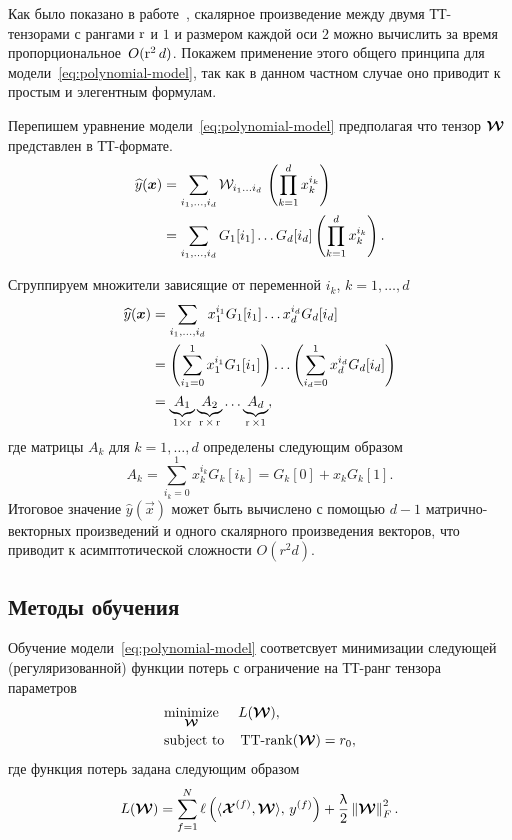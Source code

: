 Как было показано в работе~\cite{oseledets2011ttMain}, скалярное произведение между двумя ТТ-тензорами с рангами $\operatorname{r}$ и $1$ и размером каждой оси $2$ можно вычислить за время пропорциональное~$O(\operatorname{r}^2 d)$. Покажем применение этого общего принципа для модели~\eqref{eq:polynomial-model}, так как в данном частном случае оно приводит к простым и элегентным формулам.

Перепишем уравнение модели~\eqref{eq:polynomial-model} предполагая что тензор $\boldsymbol{\mathcal{W}}$ представлен в ТТ-формате.
\begin{equation*}
\begin{aligned}
\widehat{y}(\boldsymbol{x}) &= \sum_{i_1, \ldots, i_d} \mathcal{W}_{i_1 \ldots i_d} \, \left ( \prod_{k=1}^d x_k^{i_k} \right )\\
&= \sum_{i_1, \ldots, i_d} G_1[i_1] \ldots G_d[i_d] \left ( \prod_{k=1}^d x_k^{i_k} \right ).
\end{aligned}
\end{equation*}

Сгруппируем множители зависящие от переменной $i_k$, $k=1, \ldots, d$
\begin{equation*}
\begin{aligned}
\widehat{y}(\boldsymbol{x}) &= \sum_{i_1, \ldots, i_d}  x_1^{i_1} G_1[i_1] \ldots x_d^{i_d} G_d[i_d]\\
&= \left ( \sum_{i_1=0}^1 x_1^{i_1} G_1[i_1] \right ) \ldots \left ( \sum_{i_d=0}^1 x_d^{i_d} G_d[i_d] \right )\\
&= \underbrace{A_1}_{1 \times \operatorname{r}} \underbrace{A_2}_{\operatorname{r} \times \operatorname{r}} \ldots \underbrace{A_d}_{\operatorname{r} \times 1},
\end{aligned}
\end{equation*}
где матрицы $A_k$ для $k=1, \ldots, d$ определены следующим образом
\begin{equation*}
A_k = \sum_{i_k=0}^1 x_k^{i_k} G_k[i_k] = G_k[0] + x_k G_k[1].
\end{equation*}
Итоговое значение $\widehat{y}(\vec{x})$ может быть вычислено с помощью $d-1$ матрично-векторных произведений и одного скалярного произведения векторов, что приводит к асимптотической сложности $O(r^2 d)$.

\subsection{Методы обучения}
Обучение модели~\eqref{eq:polynomial-model} соответсвует минимизации следующей (регуляризованной) функции потерь с ограничение на ТТ-ранг тензора параметров
\begin{equation}
\label{eq:TT-loss-minimization}
\begin{aligned}
& \underset{\boldsymbol{\mathcal{W}}}{\text{minimize}}
& & L(\boldsymbol{\mathcal{W}}), \\
& \text{subject to}
& & \operatorname{TT-rank}(\boldsymbol{\mathcal{W}}) = r_0,
\end{aligned}
\end{equation}
где функция потерь задана следующим образом
\begin{equation}
\label{eq:TT-loss}
L(\boldsymbol{\mathcal{W}}) = \sum_{f=1}^N \ell\left(\langle \boldsymbol{\mathcal{X}}^{(f)}, \boldsymbol{\mathcal{W}} \rangle,\, y^{(f)}\right) + \frac{\uplambda}{2} \left\lVert\boldsymbol{\mathcal{W}}\right\rVert^2_F.
\end{equation}

